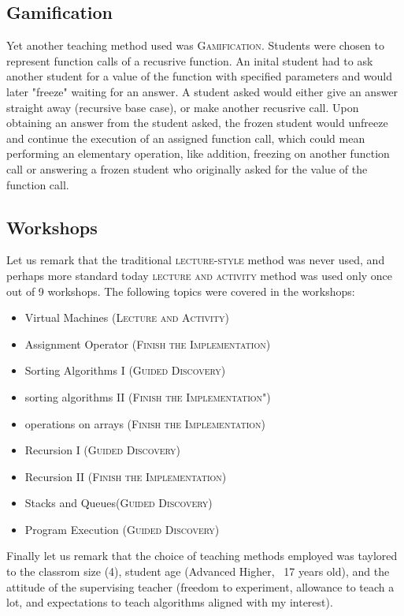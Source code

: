 \documentclass[12pt]{article}
\begin{document}
\subsection{Gamification}
Yet another teaching method used was \textsc{Gamification}. Students were chosen to represent function calls of a recusrive function. An inital student had to ask another student for a value of the function with specified parameters and would later "freeze" waiting for an answer. A student asked would either give an answer straight away (recursive base case), or make another recusrive call. Upon obtaining an answer from the student asked, the frozen student would unfreeze and continue the execution of an assigned function call, which could mean performing an elementary operation, like addition, freezing on another function call or answering a frozen student who originally asked for the value of the function call.

\subsection{Workshops}

Let us remark that the traditional \textsc{lecture-style} method was never used, and perhaps more standard today \textsc{lecture and activity} method was used only once out of 9 workshops. The following topics were covered in the workshops:

\begin{itemize}  
\item Virtual Machines (\textsc{Lecture and Activity}) 
\item Assignment Operator (\textsc{Finish the Implementation})
\item Sorting Algorithms I (\textsc{Guided Discovery}) 
\item sorting algorithms II (\textsc{Finish the Implementation"})
\item operations on arrays (\textsc{Finish the Implementation})
\item Recursion I (\textsc{Guided Discovery})
\item Recursion II (\textsc{Finish the Implementation})
\item Stacks and Queues(\textsc{Guided Discovery})
\item Program Execution (\textsc{Guided Discovery})
\end{itemize}

Finally let us remark that the choice of teaching methods employed was taylored to the classrom size (4), student age (Advanced Higher, ~17 years old), and the attitude of the supervising teacher (freedom to experiment, allowance to teach a lot, and expectations to teach algorithms aligned with my interest).
\end{document}
